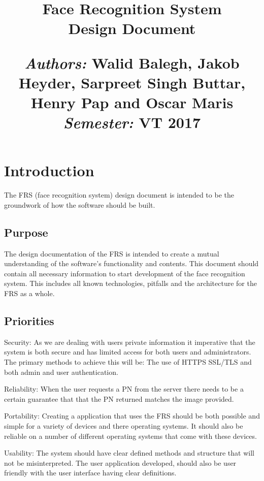 \documentclass[a4paper,11pt]{article}
\title{
\vspace{-8cm}
\begin{flushleft}
    \vspace{10cm}
    \normalfont \normalsize
    \vspace{-1.3cm}
\end{flushleft}
\vspace{3cm}
\begin{flushleft}
    \huge Face Recognition System \\
    \LARGE  Design Document\\
\end{flushleft}
\null
\vfill
\begin{minipage}{\textwidth}
\begin{flushleft} \large
\emph{Authors:} Walid Balegh, Jakob Heyder, Sarpreet Singh Buttar, Henry \hspace{45pt} Pap and Oscar Maris \\ %
\emph{Semester:} VT 2017\\ %
\end{flushleft}
\end{minipage}
}
\date{}
\begin{document}
\maketitle

\newpage

\tableofcontents

\newpage


\section{Introduction}
The FRS (face recognition system) design document is intended to be the groundwork of how the software should be built.

\subsection{Purpose}
The design documentation of the FRS is intended to create a mutual understanding of the software's functionality and contents. This document should contain all necessary information to start development of the face recognition system. This includes all known technologies, pitfalls and the architecture for the FRS as a whole.


\subsection{Priorities}

Security: As we are dealing with users private information it imperative that the system is both secure and has limited access for both users and administrators. The primary methods to achieve this will be: The use of HTTPS SSL/TLS and both admin and user authentication.

Reliability: When the user requests a PN from the server there needs to be a certain guarantee that that the PN returned matches the image provided.

Portability: Creating a application that uses the FRS should be both possible and simple for a variety of devices and there operating systems. It should also be reliable on a number of different operating systems that come with these devices.

Usability: The system should have clear defined methods and structure that will not be misinterpreted. The user application developed, should also be user friendly with the user interface having clear definitions.
\end{document}
